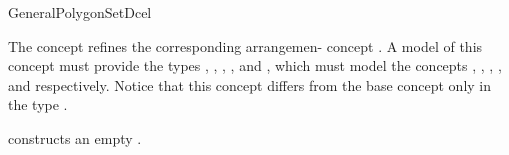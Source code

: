 \ccRefPageBegin

\begin{ccRefConcept}{GeneralPolygonSetDcel}

\ccDefinition
The concept \ccRefName{} refines the corresponding arrangemen-\dcel{} 
concept . A model of this concept must provide the 
types , , , 
, and , which must model the 
concepts 
,
,
,
, and
 respectively.
Notice that this concept differs from the base concept 
only in the type .

\ccRefines
{}


\ccCreation
{}
   {constructs an empty \dcel.}



\ccHasModels

\end{ccRefConcept}

\ccRefPageEnd

